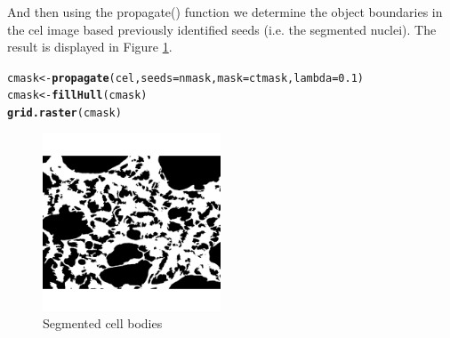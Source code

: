 \documentclass{article}\usepackage[]{graphicx}\usepackage[]{color}
\makeatletter
\newcommand{\hlnum}[1]{\textcolor[rgb]{0.686,0.059,0.569}{#1}}%
\newcommand{\hlstd}[1]{\textcolor[rgb]{0.345,0.345,0.345}{#1}}%
\newcommand{\hlkwb}[1]{\textcolor[rgb]{0.69,0.353,0.396}{#1}}%
\newcommand{\hlkwc}[1]{\textcolor[rgb]{0.333,0.667,0.333}{#1}}%
\newcommand{\hlkwd}[1]{\textcolor[rgb]{0.737,0.353,0.396}{\textbf{#1}}}%
\newenvironment{kframe}{%
 \def\at@end@of@kframe{}%
 \ifinner\ifhmode%
  \def\at@end@of@kframe{\end{minipage}}%
  \begin{minipage}{\columnwidth}%
 \fi\fi%
 \def\FrameCommand##1{\hskip\@totalleftmargin \hskip-\fboxsep
 \colorbox{shadecolor}{##1}\hskip-\fboxsep
     \hskip-\linewidth \hskip-\@totalleftmargin \hskip\columnwidth}%
 \MakeFramed {\advance\hsize-\width
   \@totalleftmargin\z@ \linewidth\hsize
   \@setminipage}}%
 {\par\unskip\endMakeFramed%
 \at@end@of@kframe}
\newenvironment{knitrout}{}{} %
\makeatother
\begin{document}
And then using the propagate() function we determine the object boundaries in the cel image based previously identified seeds (i.e. the segmented nuclei). The result is displayed in Figure \ref{fig:cmask}.
\begin{knitrout}
\color{fgcolor}\begin{kframe}
\begin{alltt}
\hlstd{cmask} \hlkwb{<-} \hlkwd{propagate}\hlstd{(cel,} \hlkwc{seeds} \hlstd{= nmask,} \hlkwc{mask} \hlstd{= ctmask,} \hlkwc{lambda} \hlstd{=} \hlnum{0.1}\hlstd{)}
\hlstd{cmask} \hlkwb{<-} \hlkwd{fillHull}\hlstd{(cmask)}
\hlkwd{grid.raster}\hlstd{(cmask)}
\end{alltt}
\end{kframe}\begin{figure}[]


{\centering \includegraphics[width=200px]{knit_figure/figcmask} 

}

\caption[Segmented cell bodies]{Segmented cell bodies\label{fig:cmask}}
\end{figure}


\end{knitrout}
\end{document}

